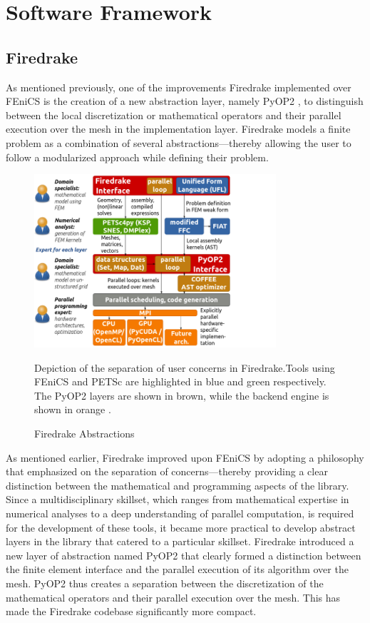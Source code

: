 \chapter{Software Framework}
\label{chapter: software}

\section{Firedrake}
\label{section:Firedrake}
As mentioned previously, one of the improvements Firedrake \cite{rathgeber2016firedrake} implemented over FEniCS \cite{alnaes2015fenics} is the creation of a new abstraction layer, namely PyOP2 \cite{rathgeber2012pyop2}, to distinguish between the local discretization or mathematical operators and their parallel execution over the mesh in the implementation layer. Firedrake models a finite problem as a combination of several abstractions---thereby allowing the user to follow a modularized approach while defining their problem.
 \begin{figure}[th]
        \centering
        \includegraphics[width=0.8\textwidth]{figures/firedrake_toolchain_users.png}
        \caption{Firedrake Abstractions}Depiction of the separation of user concerns in Firedrake.Tools using FEniCS and PETSc are highlighted in blue and green respectively. The PyOP2 layers are shown in brown, while the backend engine is shown in orange \cite{rathgeber2016firedrake}.
        \label{figure:parameter}
        \end{figure}
As mentioned earlier, Firedrake improved upon FEniCS by adopting a philosophy that emphasized on the separation of concerns---thereby providing a clear distinction between the mathematical and programming aspects of the library. Since a multidisciplinary skillset, which ranges from mathematical expertise in numerical analyses to a deep understanding of parallel computation, is required for the development of these tools, it became more practical to develop abstract layers in the library that catered to a particular skillset. Firedrake introduced a new layer of abstraction named PyOP2 \cite{logg2010dolfin} that clearly formed a distinction between the finite element interface and the parallel execution of its algorithm over the mesh. PyOP2 thus creates a separation between the discretization of the mathematical operators and their parallel execution over the mesh. This has made the Firedrake codebase significantly more compact.  

